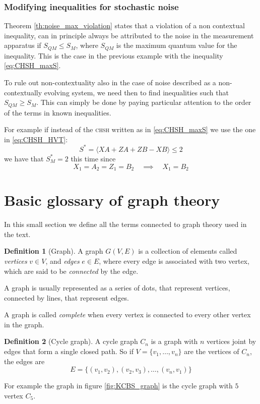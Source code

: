 \documentclass[a4paper]{article}
\newcommand{\acron}[1]{\textsc{#1}}
\theoremstyle{definition}
\newtheorem{definition}{Definition}[section]
\begin{document}
\subsubsection{Modifying inequalities for stochastic noise}
Theorem \ref{th:noise_max_violation} states that a violation of a non
contextual inequality, can in principle always be attributed to the noise in the
measurement apparatus if $S_{QM} \le S_M$, where $S_{QM}$ is the maximum
quantum value for the inequality.
This is the case in the previous example with the inequality \eqref{eq:CHSH_maxS}.

To rule out non-contextuality also in the case of noise described as a
non-contextually evolving system, we need then to find inequalities such that
$S_{QM} \ge S_M$.
This can simply be done by paying particular attention to the order of the terms
in known inequalities.

For example if instead of the \acron{chsh} written as in \eqref{eq:CHSH_maxS} we
use the one in \eqref{eq:CHSH_HVT}:
\begin{equation}
    S^* = \langle{XA+ZA+ZB-XB}\rangle \le 2
    \label{eq:CHSH_minS}
\end{equation}
we have that $S^*_M = 2$ this time since
\begin{equation}
    X_1 = A_2 = Z_1 = B_2 \quad \implies \quad X_1 = B_2
\end{equation}

\appendix
\section{Basic glossary of graph theory}
\label{sec:graph}
In this small section we define all the terms connected to graph theory used in
the text.
\begin{definition}[Graph]
    A graph $G(V,E)$ is a collection of elements called \emph{vertices} $v\in
    V$, and \emph{edges} $e\in E$, where every edge is associated with two
    vertex, which are said to be \emph{connected} by the edge.
\end{definition}
A graph is usually represented as a series of dots, that represent vertices,
connected by lines, that represent edges.

A graph is called \emph{complete} when every vertex is connected to every other vertex
in the graph.

\begin{definition}[Cycle graph]
    A cycle graph $C_n$ is a graph with $n$ vertices joint by edges that form a single closed path.
    So if $V = \{v_1,\ldots,v_n\}$ are the vertices of $C_n$, the edges are
    \begin{equation}
        E = \{(v_1,v_2),(v_2,v_3),\ldots,(v_n,v_1)\}
        \label{eq:cycle_edges}
    \end{equation}
\end{definition}
For example the graph in figure \ref{fig:KCBS_graph} is the cycle graph with
$5$ vertex $C_5$.
\end{document}

